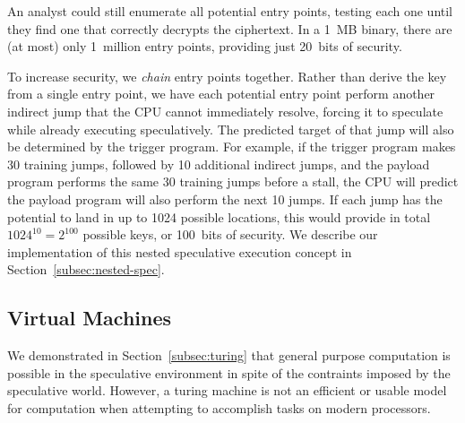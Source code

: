 An analyst could still enumerate all potential entry points, testing each one
until they find one that correctly decrypts the ciphertext. In a 1~MB binary,
there are (at most) only 1~million entry points, providing just 20~bits of
security.

To increase security, we \emph{chain} entry points together. Rather than derive
the key from a single entry point, we have each potential entry point perform
another indirect jump that the CPU cannot immediately resolve, forcing it to
speculate while already executing speculatively. The predicted target of that jump
will also be determined by the trigger program. For example, if the trigger
program makes 30 training jumps, followed by 10 additional indirect jumps, and
the payload program performs the same 30 training jumps before a stall, the CPU
will predict the payload program will also perform the next 10 jumps. If each
jump has the potential to land in up to 1024 possible locations, this would
provide in total $1024^{10} = 2^{100}$ possible keys, or 100~bits of security.
We describe our implementation of this nested speculative execution concept in
Section~\ref{subsec:nested-spec}.


%


% 
% 

\subsection{Virtual Machines}
We demonstrated in Section~\ref{subsec:turing} that general purpose computation 
is possible in the speculative environment in spite of the contraints 
imposed by the speculative world. However, a turing machine
is not an efficient or usable model for computation when
attempting to accomplish tasks on modern processors. 

